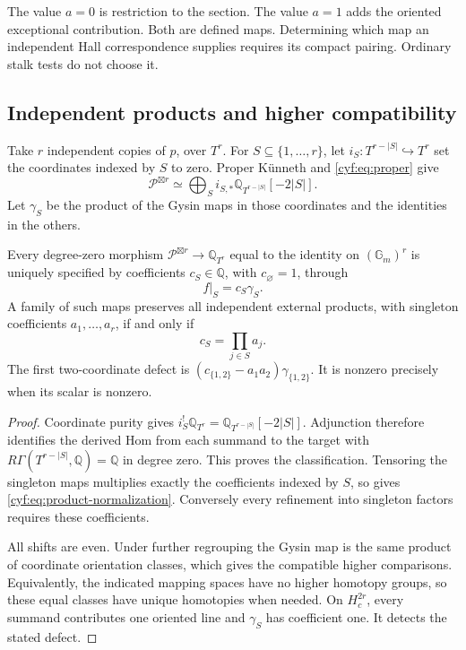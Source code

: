 The value \(a=0\) is restriction to the section.
The value \(a=1\) adds the oriented exceptional contribution.
Both are defined maps. Determining which map an independent
Hall correspondence supplies requires its compact pairing.
Ordinary stalk tests do not choose it.

\subsection{Independent products and higher compatibility}

Take \(r\) independent copies of \(p\), over \(T^r\).
For \(S\subseteq\{1,\ldots,r\}\), let
\(i_S:T^{r-|S|}\hookrightarrow T^r\) set the coordinates
indexed by \(S\) to zero. Proper K\"unneth and
\eqref{cyf:eq:proper} give
\[
 \mathscr P^{\boxtimes r}
   \simeq\bigoplus_S i_{S,*}\mathbb Q_{T^{r-|S|}}[-2|S|].
\]
Let \(\gamma_S\) be the product of the Gysin maps in those
coordinates and the identities in the others.

\begin{proposition}\label{cyf:prop:products}
Every degree-zero morphism
\(\mathscr P^{\boxtimes r}\to\mathbb Q_{T^r}\)
equal to the identity on \((\mathbb G_m)^r\) is uniquely
specified by coefficients \(c_S\in\mathbb Q\), with
\(c_\varnothing=1\), through
\[
                              f|_S=c_S\gamma_S.
\]
A family of such maps preserves all independent external
products, with singleton coefficients \(a_1,\ldots,a_r\),
if and only if
\begin{equation}\label{cyf:eq:product-normalization}
                         c_S=\prod_{j\in S}a_j.
\end{equation}
The first two-coordinate defect is
\((c_{\{1,2\}}-a_1a_2)\gamma_{\{1,2\}}\).
It is nonzero precisely when its scalar is nonzero.
\end{proposition}

\begin{proof}
Coordinate purity gives
\(i_S^!\mathbb Q_{T^r}=\mathbb Q_{T^{r-|S|}}[-2|S|]\).
Adjunction therefore identifies the derived Hom from each
summand to the target with
\(R\Gamma(T^{r-|S|},\mathbb Q)=\mathbb Q\) in degree zero.
This proves the classification. Tensoring the singleton
maps multiplies exactly the coefficients indexed by \(S\),
so gives \eqref{cyf:eq:product-normalization}.
Conversely every refinement into singleton factors requires
these coefficients.

All shifts are even. Under further regrouping the Gysin
map is the same product of coordinate orientation classes,
which gives the compatible higher comparisons. Equivalently,
the indicated mapping spaces have no higher homotopy groups,
so these equal classes have unique homotopies when needed.
On \(H_c^{2r}\), every summand contributes one oriented
line and \(\gamma_S\) has coefficient one. It detects
the stated defect.
\end{proof}

